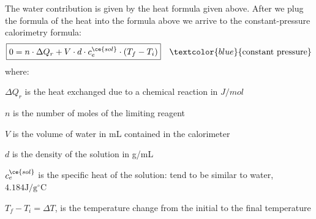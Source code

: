 \documentclass[main.tex]{subfiles}
\begin{document}
\begin{description}
    
The water contribution is given by the heat formula given above. After we plug the formula of the heat into the formula above we arrive to the constant-pressure calorimetry formula:%
\begin{equation*}\begin{split}
\boxed{  0=n\cdot\Delta Q_{r}+V\cdot d\cdot  c_{e}^{\ce{sol}}\cdot  (T_{f}-T_{i})      } \quad \textcolor{blue}{\text{constant pressure}}
\end{split}\end{equation*}
where:
\begin{where}
 \item $\Delta Q_{r}$   is the heat exchanged due to a chemical reaction in $J/mol$
  \item $n$   is the number of moles of the limiting reagent 
\item $V$ is the volume of water in mL contained in the calorimeter 
\item $d$ is the density of the solution in g/mL 
 \item $c_{e}^{\ce{sol}}$  is the specific heat of the solution: tend to be similar to water, $4.184 \text{J}/\text{g}^{\circ}\text{C}$
\item $T_{f}-T_{i}=\Delta T$, is the temperature change from the initial to the final temperature
\end{where}


\end{description}
\end{document}
